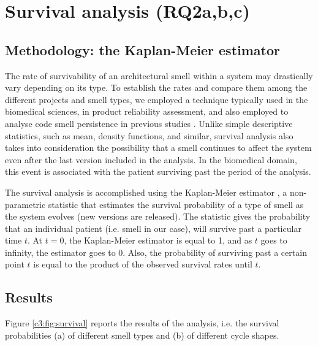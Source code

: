 \section{Survival analysis (RQ2a,b,c)}\label{c3:sec:rq2-results}
\subsection{Methodology: the Kaplan-Meier estimator}
The rate of survivability of an architectural smell within a system may drastically vary depending on its type. To establish the rates and compare them among the different projects and smell types, we employed a technique typically used in the biomedical sciences, in product reliability assessment, and also employed to analyse code smell persistence in previous studies \cite{Chatzigeorgiou2014}.
Unlike simple descriptive statistics, such as mean, density functions, and similar, survival analysis also takes into consideration the possibility that a smell continues to affect the system even after the last version included in the analysis.
In the biomedical domain, this event is associated with the patient surviving past the period of the analysis.

The survival analysis is accomplished using the Kaplan-Meier estimator \cite{Kaplan1958}, a non-parametric statistic that estimates the survival probability of a type of smell as the system evolves (new versions are released).
The statistic gives the probability that an individual patient (i.e. smell in our case), will survive past a particular time $t$.
At $t = 0$, the Kaplan-Meier estimator is equal to 1, and as $t$ goes to infinity, the estimator goes to 0. Also, the probability of surviving past a certain point $t$ is equal to the product of the observed survival rates until $t$.

\subsection{Results}
Figure \ref{c3:fig:survival} reports the results of the analysis, i.e. the survival probabilities (a) of different smell types and (b) of different cycle shapes.

